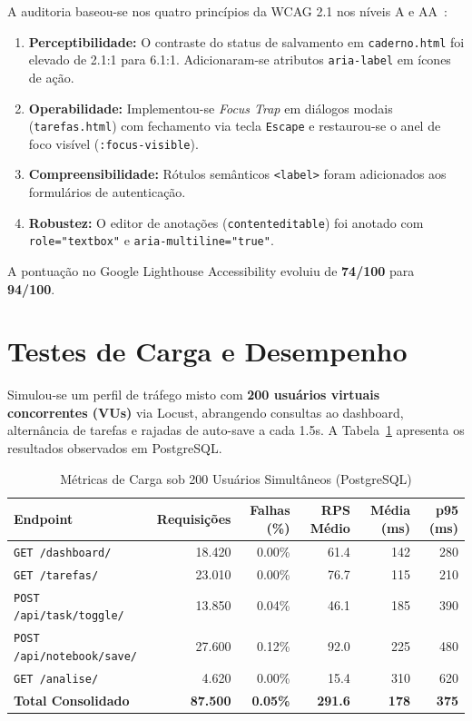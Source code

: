 \documentclass[12pt]{article}
\begin{document}
A auditoria baseou-se nos quatro princípios da WCAG 2.1 nos níveis A e AA~\cite{caldwell2008}:
\begin{enumerate}
    \item \textbf{Perceptibilidade:} O contraste do status de salvamento em \texttt{caderno.html} foi elevado de 2.1:1 para 6.1:1. Adicionaram-se atributos \texttt{aria-label} em ícones de ação.
    \item \textbf{Operabilidade:} Implementou-se \textit{Focus Trap} em diálogos modais (\texttt{tarefas.html}) com fechamento via tecla \texttt{Escape} e restaurou-se o anel de foco visível (\texttt{:focus-visible}).
    \item \textbf{Compreensibilidade:} Rótulos semânticos \texttt{<label>} foram adicionados aos formulários de autenticação.
    \item \textbf{Robustez:} O editor de anotações (\texttt{contenteditable}) foi anotado com \texttt{role="textbox"} e \texttt{aria-multiline="true"}.
\end{enumerate}

A pontuação no Google Lighthouse Accessibility evoluiu de \textbf{74/100} para \textbf{94/100}.

\section{Testes de Carga e Desempenho}

Simulou-se um perfil de tráfego misto com \textbf{200 usuários virtuais concorrentes (VUs)} via Locust, abrangendo consultas ao dashboard, alternância de tarefas e rajadas de auto-save a cada 1.5s. A Tabela~\ref{tab:carga} apresenta os resultados observados em PostgreSQL.

\begin{table}[htbp]
\centering
\caption{Métricas de Carga sob 200 Usuários Simultâneos (PostgreSQL)}
\label{tab:carga}
\small
\begin{tabular}{@{}lrrrrr@{}}
\toprule
\textbf{Endpoint} & \textbf{Requisições} & \textbf{Falhas (\%)} & \textbf{RPS Médio} & \textbf{Média (ms)} & \textbf{p95 (ms)} \\ \midrule
\texttt{GET /dashboard/} & 18.420 & 0.00\% & 61.4 & 142 & 280 \\
\texttt{GET /tarefas/} & 23.010 & 0.00\% & 76.7 & 115 & 210 \\
\texttt{POST /api/task/toggle/} & 13.850 & 0.04\% & 46.1 & 185 & 390 \\
\texttt{POST /api/notebook/save/} & 27.600 & 0.12\% & 92.0 & 225 & 480 \\
\texttt{GET /analise/} & 4.620 & 0.00\% & 15.4 & 310 & 620 \\ \midrule
\textbf{Total Consolidado} & \textbf{87.500} & \textbf{0.05\%} & \textbf{291.6} & \textbf{178} & \textbf{375} \\ \bottomrule
\end{tabular}
\end{table}
\end{document}
